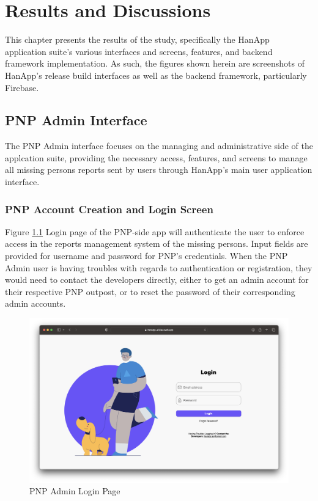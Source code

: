 \chapter{Results and Discussions}
This chapter presents the results of the study, specifically the HanApp application suite's various interfaces and screens, features, and backend framework implementation. As such, the figures shown herein are screenshots of HanApp's release build interfaces as well as the backend framework, particularly Firebase.

\section{PNP Admin Interface}
The PNP Admin interface focuses on the managing and administrative side of the applcation suite, providing the necessary access, features, and screens to manage all missing persons reports sent by users through HanApp's main user application interface.

\subsection{PNP Account Creation and Login Screen}

Figure \ref{fig:PNP1} Login page of the PNP-side app will authenticate the user to enforce access in the reports management system of the missing persons. Input fields are provided for username and password for PNP’s credentials. When the PNP Admin user is having troubles with regards to authentication or registration, they would need to contact the developers directly, either to get an admin account for their respective PNP outpost, or to reset the password of their corresponding admin accounts. 

\begin{figure}[!h]
    \centering
    \includegraphics[scale=0.25]{figures/Chapter4/PNP/Login.png}
    \caption{PNP Admin Login Page}
    \label{fig:PNP1}
\end{figure}

